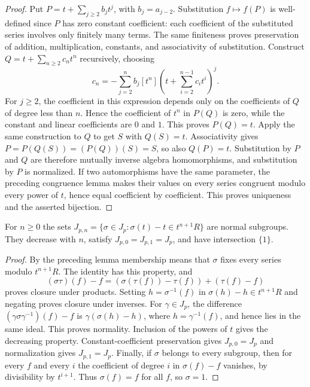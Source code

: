 \begin{proof}
Put $P=t+\sum_{j\ge2}b_jt^j$, with $b_j=a_{j-2}$.
Substitution $f\mapsto f(P)$ is well-defined since $P$ has zero constant
coefficient: each coefficient of the substituted series involves only
finitely many terms. The same finiteness proves preservation of addition,
multiplication, constants, and associativity of substitution.
Construct $Q=t+\sum_{n\ge2}c_nt^n$ recursively, choosing
\[
 c_n=-\sum_{j=2}^{n}b_j[t^n]
       \left(t+\sum_{i=2}^{n-1}c_it^i\right)^j.
\]
For $j\ge2$, the coefficient in this expression depends only on the
coefficients of $Q$ of degree less than $n$. Hence the coefficient of
$t^n$ in $P(Q)$ is zero, while the constant and linear coefficients
are $0$ and $1$. This proves $P(Q)=t$.
Apply the same construction to $Q$ to get $S$ with $Q(S)=t$.
Associativity gives $P=P(Q(S))=(P(Q))(S)=S$, so also $Q(P)=t$.
Substitution by $P$ and $Q$ are therefore mutually inverse algebra
homomorphisms, and substitution by $P$ is normalized.
If two automorphisms have the same parameter, the preceding congruence
lemma makes their values on every series congruent modulo every power
of $t$, hence equal coefficient by coefficient. This proves uniqueness
and the asserted bijection.
\end{proof}

\begin{lemma}
\label{lem:nottingham-congruence-filtration}
\leanok
For $n\ge0$ the sets
$J_{p,n}=\{\sigma\in J_p:\sigma(t)-t\in t^{n+1}R\}$
are normal subgroups. They decrease with $n$, satisfy
$J_{p,0}=J_{p,1}=J_p$, and have intersection $\{1\}$.
\end{lemma}

\begin{proof}
By the preceding lemma membership means that $\sigma$ fixes every
series modulo $t^{n+1}R$. The identity has this property, and
\[
 (\sigma\tau)(f)-f=(\sigma(\tau(f))-\tau(f))+(\tau(f)-f)
\]
proves closure under products. Setting $h=\sigma^{-1}(f)$ in
$\sigma(h)-h\in t^{n+1}R$ and negating proves closure under inverses.
For $\gamma\in J_p$, the difference
$(\gamma\sigma\gamma^{-1})(f)-f$
is $\gamma(\sigma(h)-h)$, where $h=\gamma^{-1}(f)$, and hence lies
in the same ideal. This proves normality. Inclusion of the powers
of $t$ gives the decreasing property. Constant-coefficient
preservation gives $J_{p,0}=J_p$ and normalization gives
$J_{p,1}=J_p$.
Finally, if $\sigma$ belongs to every subgroup, then for every $f$
and every $i$ the coefficient of degree $i$ in $\sigma(f)-f$
vanishes, by divisibility by $t^{i+1}$. Thus $\sigma(f)=f$ for all
$f$, so $\sigma=1$.
\end{proof}

